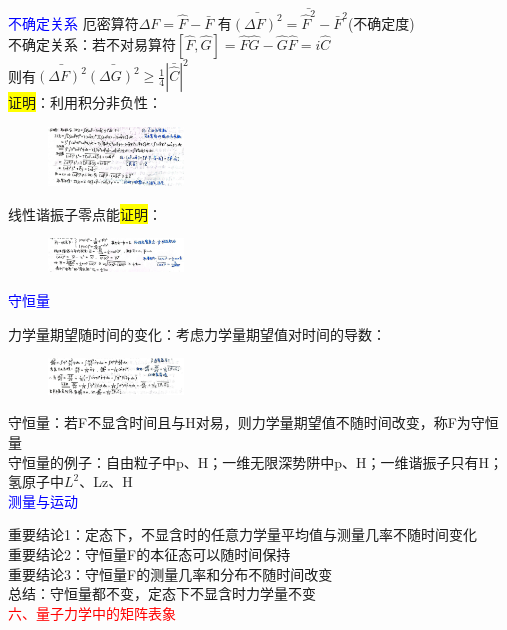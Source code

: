 \documentclass[a4paper,8pt]{extarticle} %
\newcommand{\bluetext}[1]{\textcolor{blue}{#1}}
\newcommand{\redtext}[1]{\textcolor{red}{#1}}
\newcommand{\yellowback}[1]{\colorbox{yellow}{#1}}
\begin{document}
\begin{multicols}{3}
\bluetext{不确定关系}
厄密算符$\Delta F = \hat{F}-\bar{F}$
有$\bar{(\Delta F)^2} = \bar{\hat{F}^2} - \bar{F}^2$(不确定度)\\
不确定关系：若不对易算符$[\hat{F},\hat{G}] = \hat{F}\hat{G}-\hat{G}\hat{F} = i\hat{C}$\\
则有$\bar{(\Delta F)^2}\bar{(\Delta G)^2} \geq \frac{1}{4}|\bar{\hat{C}}|^2$\\
\yellowback{证明}：利用积分非负性：
\begin{figure}[H]
    \vspace{-0.5cm}
    \centering
    \includegraphics[width=0.32\textwidth]{images/28.png}
    \vspace{-0.6cm}
\end{figure}
线性谐振子零点能\yellowback{证明}：
\begin{figure}[H]
    \vspace{-0.5cm}
    \centering
    \includegraphics[width=0.32\textwidth]{images/3.png}
    \vspace{-0.6cm}
\end{figure}
\bluetext{守恒量}

力学量期望随时间的变化：考虑力学量期望值对时间的导数：\\
\begin{figure}[H]
    \vspace{-0.5cm}
    \centering
    \includegraphics[width=0.32\textwidth]{images/29.png}
    \vspace{-0.6cm}
\end{figure}
守恒量：若F不显含时间且与H对易，则力学量期望值不随时间改变，称F为守恒量\\
守恒量的例子：自由粒子中p、H；一维无限深势阱中p、H；一维谐振子只有H；氢原子中$L^2$、Lz、H\\
\bluetext{测量与运动}

重要结论1：定态下，不显含时的任意力学量平均值与测量几率不随时间变化\\
重要结论2：守恒量F的本征态可以随时间保持\\
重要结论3：守恒量F的测量几率和分布不随时间改变\\
总结：守恒量都不变，定态下不显含时力学量不变\\
\redtext{六、量子力学中的矩阵表象}


\end{multicols}
\end{document}
